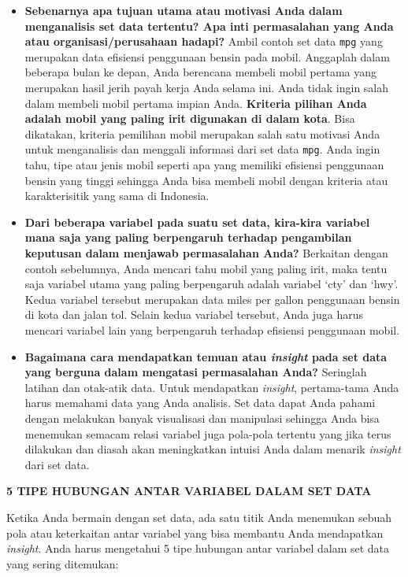 \documentclass[openany]{book}
\begin{document}
\begin{itemize}
\item
  \textbf{Sebenarnya apa tujuan utama atau motivasi Anda dalam
  menganalisis set data tertentu? Apa inti permasalahan yang Anda atau
  organisasi/perusahaan hadapi?} Ambil contoh set data \texttt{mpg} yang
  merupakan data efisiensi penggunaan bensin pada mobil. Anggaplah dalam
  beberapa bulan ke depan, Anda berencana membeli mobil pertama yang
  merupakan hasil jerih payah kerja Anda selama ini. Anda tidak ingin
  salah dalam membeli mobil pertama impian Anda. \textbf{Kriteria
  pilihan Anda adalah mobil yang paling irit digunakan di dalam kota}.
  Bisa dikatakan, kriteria pemilihan mobil merupakan salah satu motivasi
  Anda untuk menganalisis dan menggali informasi dari set data
  \texttt{mpg}. Anda ingin tahu, tipe atau jenis mobil seperti apa yang
  memiliki efisiensi penggunaan bensin yang tinggi sehingga Anda bisa
  membeli mobil dengan kriteria atau karakterisitik yang sama di
  Indonesia.
\item
  \textbf{Dari beberapa variabel pada suatu set data, kira-kira variabel
  mana saja yang paling berpengaruh terhadap pengambilan keputusan dalam
  menjawab permasalahan Anda?} Berkaitan dengan contoh sebelumnya, Anda
  mencari tahu mobil yang paling irit, maka tentu saja variabel utama
  yang paling berpengaruh adalah variabel `cty' dan `hwy'. Kedua
  variabel tersebut merupakan data miles per gallon penggunaan bensin di
  kota dan jalan tol. Selain kedua variabel tersebut, Anda juga harus
  mencari variabel lain yang berpengaruh terhadap efisiensi penggunaan
  mobil.
\item
  \textbf{Bagaimana cara mendapatkan temuan atau \emph{insight} pada set
  data yang berguna dalam mengatasi permasalahan Anda?} Seringlah
  latihan dan otak-atik data. Untuk mendapatkan \emph{insight},
  pertama-tama Anda harus memahami data yang Anda analisis. Set data
  dapat Anda pahami dengan melakukan banyak visualisasi dan manipulasi
  sehingga Anda bisa menemukan semacam relasi variabel juga pola-pola
  tertentu yang jika terus dilakukan dan diasah akan meningkatkan
  intuisi Anda dalam menarik \emph{insight} dari set data.
\end{itemize}

\textbf{5 TIPE HUBUNGAN ANTAR VARIABEL DALAM SET DATA}

Ketika Anda bermain dengan set data, ada satu titik Anda menemukan
sebuah pola atau keterkaitan antar variabel yang bisa membantu Anda
mendapatkan \emph{insight}. Anda harus mengetahui 5 tipe hubungan antar
variabel dalam set data yang sering ditemukan:
\end{document}
